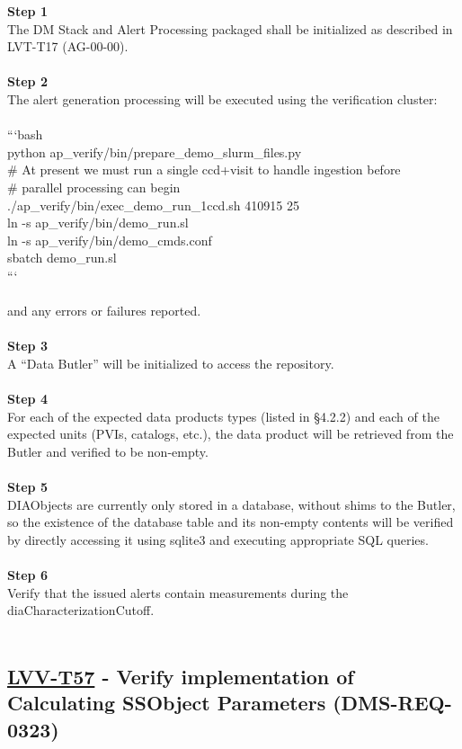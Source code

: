 \textbf{Step 1}\\
The DM Stack and Alert Processing packaged shall be initialized as
described in LVT-T17 (AG-00-00).\\
~\\
\textbf{Step 2}\\
The alert generation processing will be executed using the verification
cluster:\\
~\\
```bash\\
python ap\_verify/bin/prepare\_demo\_slurm\_files.py\\
\# At present we must run a single ccd+visit to handle ingestion
before\\
\# parallel processing can begin\\
./ap\_verify/bin/exec\_demo\_run\_1ccd.sh 410915 25\\
ln -s ap\_verify/bin/demo\_run.sl\\
ln -s ap\_verify/bin/demo\_cmds.conf\\
sbatch demo\_run.sl\\
```\\
~\\
and any errors or failures reported.\\
~\\
\textbf{Step 3}\\
A ``Data Butler'' will be initialized to access the repository.\\
~\\
\textbf{Step 4}\\
For each of the expected data products types (listed in §4.2.2) and each
of the expected units (PVIs, catalogs, etc.), the data product will be
retrieved from the Butler and verified to be non-empty.\\
~\\
\textbf{Step 5}\\
DIAObjects are currently only stored in a database, without shims to the
Butler, so the existence of the database table and its non-empty
contents will be verified by directly accessing it using sqlite3 and
executing appropriate SQL queries.\\
~\\
\textbf{Step 6}\\
Verify that the issued alerts contain measurements during the
diaCharacterizationCutoff.\\
~\\

\hypertarget{lvv-t57---verify-implementation-of-calculating-ssobject-parameters-dms-req-0323}{%
\subsection{\texorpdfstring{\href{https://jira.lsstcorp.org/secure/Tests.jspa\#/testCase/LVV-T57}{LVV-T57}
- Verify implementation of Calculating SSObject Parameters
(DMS-REQ-0323)}{LVV-T57 - Verify implementation of Calculating SSObject Parameters (DMS-REQ-0323)}}\label{lvv-t57---verify-implementation-of-calculating-ssobject-parameters-dms-req-0323}}

